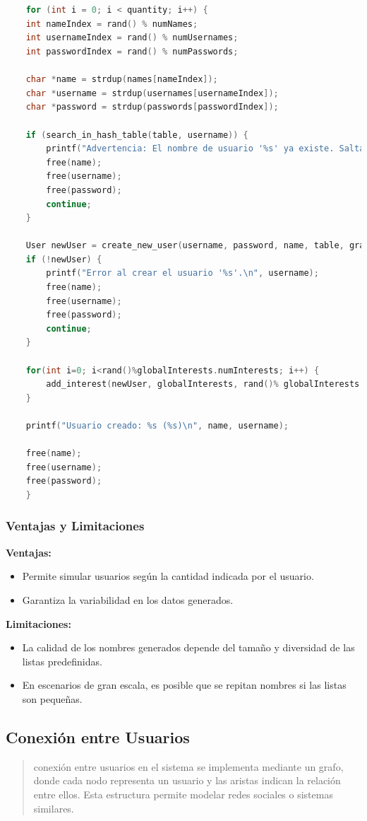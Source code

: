 \documentclass[9pt,letterpaper,onecolumn]{rho-class/rho}
\begin{document}
\begin{lstlisting}[caption={Ejemplo de código, utilizando las normas de codificación}, label={lst:normas_codificacion}, language=C]
	
	
	for (int i = 0; i < quantity; i++) {
	int nameIndex = rand() % numNames;
	int usernameIndex = rand() % numUsernames;
	int passwordIndex = rand() % numPasswords;
	
	char *name = strdup(names[nameIndex]);
	char *username = strdup(usernames[usernameIndex]);
	char *password = strdup(passwords[passwordIndex]);
	
	if (search_in_hash_table(table, username)) {
		printf("Advertencia: El nombre de usuario '%s' ya existe. Saltando...\n", username);
		free(name);
		free(username);
		free(password);
		continue;
	}
	
	User newUser = create_new_user(username, password, name, table, graph, globalInterests);
	if (!newUser) {
		printf("Error al crear el usuario '%s'.\n", username);
		free(name);
		free(username);
		free(password);
		continue;
	}
	
	for(int i=0; i<rand()%globalInterests.numInterests; i++) {
		add_interest(newUser, globalInterests, rand()% globalInterests.numInterests);
	}
	
	printf("Usuario creado: %s (%s)\n", name, username);
	
	free(name);
	free(username);
	free(password);
	}
\end{lstlisting}

\subsubsection{Ventajas y Limitaciones}
\textbf{Ventajas:}
\begin{itemize}
	\item Permite simular usuarios según la cantidad indicada por el usuario.
	\item Garantiza la variabilidad en los datos generados.
\end{itemize}
\textbf{Limitaciones:}
\begin{itemize}
	\item La calidad de los nombres generados depende del tamaño y diversidad de las listas predefinidas.
	\item En escenarios de gran escala, es posible que se repitan nombres si las listas son pequeñas.
\end{itemize}

\subsection{Conexión entre Usuarios}
\begin{quote}
	conexión entre usuarios en el sistema se implementa mediante un grafo, donde cada nodo representa un usuario y las aristas indican la relación entre ellos.
	Esta estructura permite modelar redes sociales o sistemas similares.
\end{quote}
\end{document}
